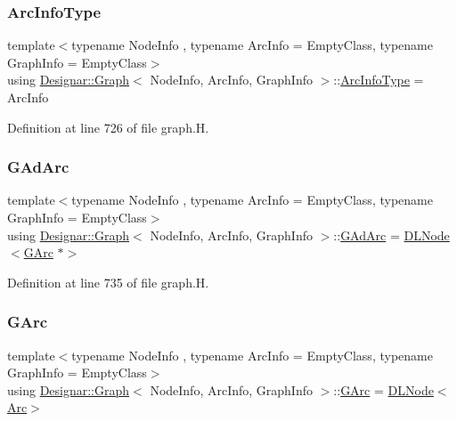 \subsubsection{\texorpdfstring{Arc\+Info\+Type}{ArcInfoType}}
{\footnotesize\ttfamily template$<$typename Node\+Info , typename Arc\+Info  = Empty\+Class, typename Graph\+Info  = Empty\+Class$>$ \\
using \hyperlink{class_designar_1_1_graph}{Designar\+::\+Graph}$<$ Node\+Info, Arc\+Info, Graph\+Info $>$\+::\hyperlink{class_designar_1_1_graph_abc2adb4841a6d092d5093f9e60f2c8be}{Arc\+Info\+Type} =  Arc\+Info}



Definition at line 726 of file graph.\+H.

\mbox{\label{class_designar_1_1_graph_a7d00558995946c5653522148b54971bc}} 
\subsubsection{\texorpdfstring{G\+Ad\+Arc}{GAdArc}}
{\footnotesize\ttfamily template$<$typename Node\+Info , typename Arc\+Info  = Empty\+Class, typename Graph\+Info  = Empty\+Class$>$ \\
using \hyperlink{class_designar_1_1_graph}{Designar\+::\+Graph}$<$ Node\+Info, Arc\+Info, Graph\+Info $>$\+::\hyperlink{class_designar_1_1_graph_a7d00558995946c5653522148b54971bc}{G\+Ad\+Arc} =  \hyperlink{class_designar_1_1_d_l_node}{D\+L\+Node}$<$\hyperlink{class_designar_1_1_graph_a5ad9e18b71899c2d4979426e367e5573}{G\+Arc} $\ast$$>$\hspace{0.3cm}{\ttfamily [protected]}}



Definition at line 735 of file graph.\+H.

\mbox{\label{class_designar_1_1_graph_a5ad9e18b71899c2d4979426e367e5573}} 
\subsubsection{\texorpdfstring{G\+Arc}{GArc}}
{\footnotesize\ttfamily template$<$typename Node\+Info , typename Arc\+Info  = Empty\+Class, typename Graph\+Info  = Empty\+Class$>$ \\
using \hyperlink{class_designar_1_1_graph}{Designar\+::\+Graph}$<$ Node\+Info, Arc\+Info, Graph\+Info $>$\+::\hyperlink{class_designar_1_1_graph_a5ad9e18b71899c2d4979426e367e5573}{G\+Arc} =  \hyperlink{class_designar_1_1_d_l_node}{D\+L\+Node}$<$\hyperlink{class_designar_1_1_graph_a74c730ef4ce2d20f998d72bd25c2b5bf}{Arc}$>$\hspace{0.3cm}{\ttfamily [protected]}}



